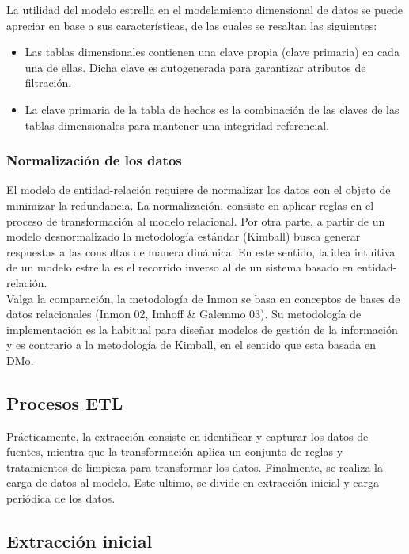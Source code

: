 \documentclass[12pt,jou]{apa7}
\begin{document}
La utilidad del modelo estrella en el modelamiento dimensional de datos se puede apreciar en base a sus características, de las cuales se resaltan las siguientes:

\begin{itemize}
\item Las tablas dimensionales contienen una clave propia (clave primaria) en cada una de ellas. Dicha clave es autogenerada para garantizar atributos de filtración.
		
\item La clave primaria de la tabla de hechos es la combinación de las claves de las tablas dimensionales para mantener una integridad referencial.
		
\end{itemize}

\subsubsection{Normalización de los datos}
El modelo de entidad-relación requiere de normalizar los datos con el objeto de minimizar la redundancia. La normalización, consiste en aplicar reglas en el proceso de transformación al modelo relacional. Por otra parte, a partir de un modelo desnormalizado la metodología estándar (Kimball) busca generar respuestas a las consultas de manera dinámica. En este sentido, la idea intuitiva de un modelo estrella es el recorrido inverso al de un sistema basado en entidad-relación.\\

Valga la comparación, la metodología de Inmon se basa en conceptos de bases de datos relacionales (Inmon 02, Imhoff \& Galemmo 03). Su metodología de implementación es la habitual para diseñar modelos de gestión de la información y es contrario a la metodología de Kimball, en el sentido que esta basada en DMo.


\subsection{Procesos ETL}
Prácticamente, la extracción consiste en identificar y capturar los datos de fuentes, mientra que la transformación aplica un conjunto de reglas y tratamientos de limpieza para transformar los datos. Finalmente, se realiza la carga de datos al modelo. Este ultimo, se divide en extracción inicial y carga periódica de los datos.

\subsection{Extracción inicial}
\end{document}
